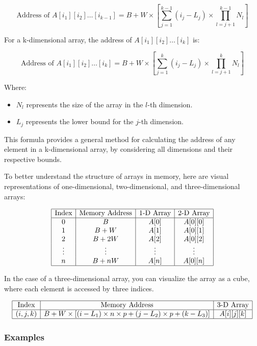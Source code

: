 \documentclass{book}
\begin{document}
\[
\text{Address of } A[i_1][i_2] \dots [i_{k-1}] = B + W \times \left[ \sum_{j=1}^{k-1} (i_j - L_j) \times \prod_{l=j+1}^{k-1} N_l \right]
\]

For a k-dimensional array, the address of \( A[i_1][i_2] \dots [i_k] \) is:

\[
\text{Address of } A[i_1][i_2] \dots [i_k] = B + W \times \left[ \sum_{j=1}^{k} (i_j - L_j) \times \prod_{l=j+1}^{k} N_l \right]
\]

Where:
\begin{itemize}
	\item \( N_l \) represents the size of the array in the \( l \)-th dimension.
	\item \( L_j \) represents the lower bound for the \( j \)-th dimension.
\end{itemize}

This formula provides a general method for calculating the address of any element in a k-dimensional array, by considering all dimensions and their respective bounds.

To better understand the structure of arrays in memory, here are visual representations of one-dimensional, two-dimensional, and three-dimensional arrays:

\[
\begin{array}{|c|c|c|c|}
	\hline
	\text{Index} & \text{Memory Address} & \text{1-D Array} & \text{2-D Array} \\
	\hline
	0 & B & A[0] & A[0][0] \\
	1 & B + W & A[1] & A[0][1] \\
	2 & B + 2W & A[2] & A[0][2] \\
	\vdots & \vdots & \vdots & \vdots \\
	n & B + nW & A[n] & A[0][n] \\
	\hline
\end{array}
\]

In the case of a three-dimensional array, you can visualize the array as a cube, where each element is accessed by three indices.

\[
\begin{array}{|c|c|c|}
	\hline
	\text{Index} & \text{Memory Address} & \text{3-D Array} \\
	\hline
	(i, j, k) & B + W \times \left[ (i - L_1) \times n \times p + (j - L_2) \times p + (k - L_3) \right] & A[i][j][k] \\
	\hline
\end{array}
\]

\subsubsection{Examples}
\end{document}
